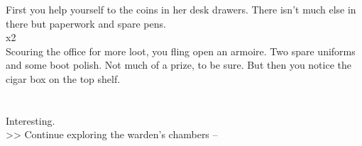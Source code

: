 First you help yourself to the coins in her desk drawers. There isn’t much else in there but paperwork and spare pens.\\
 x2\\

Scouring the office for more loot, you fling open an armoire. Two spare uniforms and some boot polish. Not much of a prize, to be sure. But then you notice the cigar box on the top shelf.\\
\\
\\

Interesting.\\

>> Continue exploring the warden’s chambers -- 